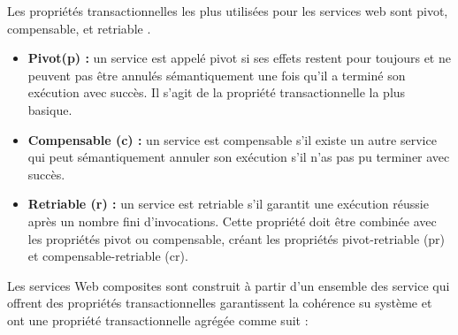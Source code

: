 Les propriétés transactionnelles les plus utilisées pour les services web sont pivot, compensable, et retriable \cite{1} \cite{8}. 
 
\begin{itemize}

    \item \textbf{ Pivot(p) :} un service est appelé pivot si ses effets restent pour toujours et ne peuvent pas être annulés sémantiquement une fois qu’il a terminé son exécution avec succès. Il s’agit de la propriété transactionnelle la plus basique.
    
    \item \textbf{Compensable (c) :} un service est compensable s’il existe un autre service qui peut sémantiquement annuler son exécution s'il n'as pas pu terminer avec succès.  
    
    \item \textbf{Retriable (r) : } un service est retriable s’il garantit une exécution réussie après un nombre fini d’invocations. Cette propriété doit être combinée avec les propriétés pivot ou compensable, créant les propriétés pivot-retriable (pr) et compensable-retriable (cr).
    
 \end{itemize}
 
 
 Les services Web composites sont construit à partir d'un ensemble des service qui offrent des propriétés transactionnelles garantissent la cohérence su système et ont une propriété transactionnelle agrégée comme suit \cite{1} \cite{2}: 
 
